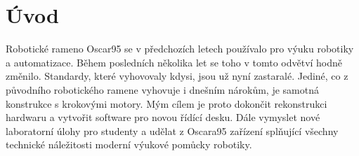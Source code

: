 \chapter*{Úvod}
Robotické rameno Oscar95 se v předchozích letech používalo pro výuku robotiky a automatizace. \cite{Oscar95} Během posledních několika let se toho v tomto odvětví hodně změnilo. Standardy, které vyhovovaly kdysi, jsou už nyní zastaralé. Jediné, co z původního robotického ramene vyhovuje i dnešním nárokům, je samotná konstrukce s krokovými motory. Mým cílem je proto dokončit rekonstrukci hardwaru a vytvořit software pro novou řídící desku. Dále vymyslet nové laboratorní úlohy pro studenty a udělat z Oscara95 zařízení splňující všechny technické náležitosti moderní výukové pomůcky robotiky.
\newpage